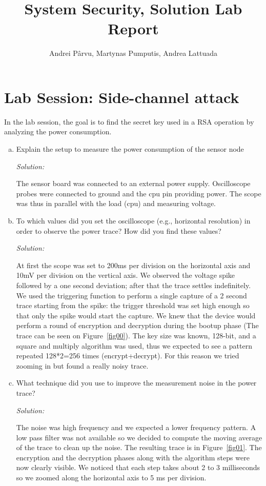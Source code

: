 \documentclass[a4paper,11pt]{article}
\title{System Security,
\ifsolution Solution \else \fi
Lab Report}
\author{Andrei Pârvu, Martynas Pumputis, Andrea Lattuada}
\newenvironment{solution}%
{\par{\noindent\small\textit{Solution:}}\vspace{-12pt}\begin{framed}}%
{\end{framed}\par}
\begin{document}
\maketitle

\section{Lab Session: Side-channel attack}
In the lab session, the goal is to find the secret key used in a RSA
operation by analyzing the power consumption.
\begin{enumerate}[(a)]
\item Explain the setup to measure the power consumption of the sensor node
\ifsolution\begin{solution}
  The sensor board was connected to an external power supply. Oscilloscope probes were connected to ground and the cpu pin providing power. The scope was thus in parallel with the load (cpu) and measuring voltage.
\end{solution}\fi

\item To which values did you set the oscilloscope (e.g., horizontal
resolution) in order to observe the power trace? How did you find
these values?
\ifsolution\begin{solution}
  At first the scope was set to 200ms per division on the horizontal axis and 10mV per division on the vertical axis. We observed the voltage spike followed by a one second deviation; after that the trace settles indefinitely. We used the triggering function to perform a single capture of a 2 second trace starting from the spike: the trigger threshold was set high enough so that only the spike would start the capture. We knew that the device would perform a round of encryption and decryption during the bootup phase (The trace can be seen on Figure~\ref{fig00}).
  The key size was known, 128-bit, and a square and multiply algorithm was used, thus we expected to see a pattern repeated 128*2=256 times (encrypt+decrypt). For this reason we tried zooming in but found a really noisy trace.
\end{solution}\fi

\item What technique did you use to improve the measurement noise in
the power trace?
\ifsolution\begin{solution}
  The noise was high frequency and we expected a lower frequency pattern. A low pass filter was not available so we decided to compute the moving average of the trace to clean up the noise.
  The resulting trace is in Figure~\ref{fig01}.
  The encryption and the decryption phases along with the algorithm steps were now clearly visible.
  We noticed that each step takes about 2 to 3 milliseconds so we zoomed along the horizontal axis to 5 ms per division.
\end{solution}\fi


\end{enumerate}
\end{document}

